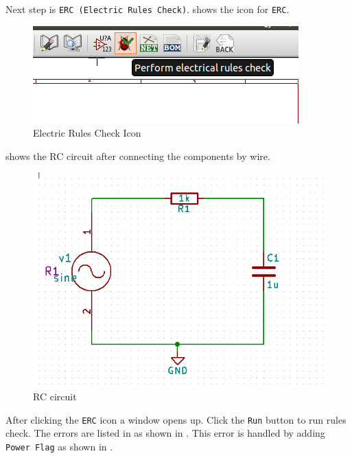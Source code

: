\begin{itemize}
Next step is {\tt ERC (Electric Rules Check)}.  shows the icon for {\tt ERC}.

\begin{figure}[!htp]
    \centering
    \includegraphics[width=\lgfig]{figures/erc1.png}
    \caption{Electric Rules Check Icon}
    \label{erc1}
\end{figure}

 shows the RC circuit after connecting the components by wire.

\begin{figure}[!htp]
    \centering
    \includegraphics[width=\lgfig]{figures/rc_complete1.png}
    \caption{RC circuit}
    \label{rc_complete1}
\end{figure}

\pagebreak

After clicking the {\tt ERC} icon a window opens up. Click the {\tt Run} button to run rules check. The errors are listed in as shown in . This error is handled by adding {\tt Power Flag} as shown in .


\end{itemize}
